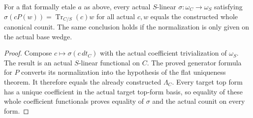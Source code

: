\begin{theorem}
\label{thm:kn-nadel-etale-canonical-counit-uniqueness}
\leanok
For a flat formally etale $a$ as above, every actual $S$-linear
$\sigma:\omega_C\to\omega_S$ satisfying
$\sigma(cP(w))=\operatorname{Tr}_{C/S}(c)w$ for all actual $c,w$
equals the constructed whole canonical counit.  The same conclusion
holds if the normalization is only given on the actual base wedge.
\end{theorem}
\begin{proof}
Compose $c\mapsto\sigma(c\,dt_C)$ with the actual coefficient
trivialization of $\omega_S$.  The result is an actual $S$-linear
functional on $C$.  The proved generator formula for $P$ converts its
normalization into the hypothesis of the flat uniqueness theorem.
It therefore equals the already constructed $\Lambda_C$.  Every
target top form has a unique coefficient in the actual target
top-form basis, so equality of these whole coefficient functionals
proves equality of $\sigma$ and the actual counit on every form.
\end{proof}


